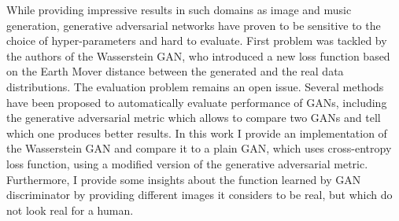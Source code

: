 While providing impressive results in such domains as image and music generation, generative adversarial networks have proven to be sensitive to the choice of hyper-parameters and hard to evaluate. First problem was tackled by the authors of the Wasserstein GAN, who introduced a new loss function based on the Earth Mover distance between the generated and the real data distributions. The evaluation problem remains an open issue. Several methods have been proposed to automatically evaluate performance of GANs, including the generative adversarial metric which allows to compare two GANs and tell which one produces better results. In this work I provide an implementation of the Wasserstein GAN and compare it to a plain GAN, which uses cross-entropy loss function, using a modified version of the generative adversarial metric. Furthermore, I provide some insights about the function learned by GAN discriminator by providing different images it considers to be real, but which do not look real for a human. 